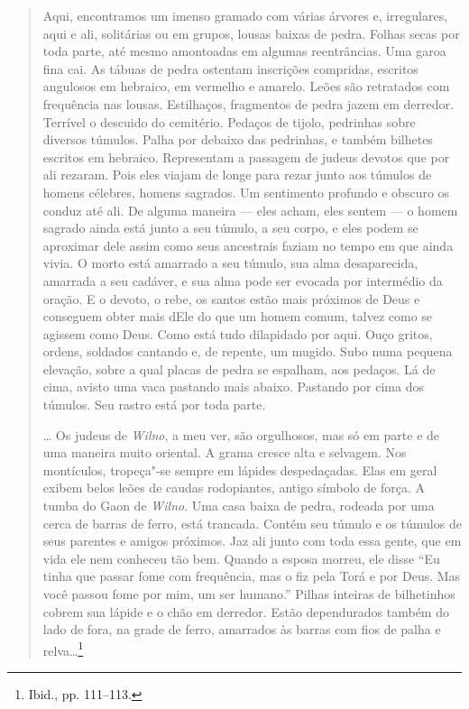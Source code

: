 %
\begin{quote}
Aqui, encontramos um imenso gramado com várias árvores e, irregulares,
aqui e ali, solitárias ou em grupos, lousas baixas de pedra. Folhas
secas por toda parte, até mesmo amontoadas em algumas reentrâncias. Uma
garoa fina cai. As tábuas de pedra ostentam inscrições compridas,
escritos angulosos em hebraico, em vermelho e amarelo. Leões são
retratados com frequência nas lousas. Estilhaços, fragmentos de pedra
jazem em derredor. Terrível o descuido do cemitério. Pedaços de tijolo,
pedrinhas sobre diversos túmulos. Palha por debaixo das pedrinhas, e
também bilhetes escritos em hebraico. Representam a passagem de judeus
devotos que por ali rezaram. Pois eles viajam de longe para rezar junto
aos túmulos de homens célebres, homens sagrados. Um sentimento profundo
e obscuro os conduz até ali. De alguma maneira --- eles acham, eles sentem
--- o homem sagrado ainda está junto a seu túmulo, a seu corpo, e eles
podem se aproximar dele assim como seus ancestrais faziam no tempo em
que ainda vivia. O morto está amarrado a seu túmulo, sua alma
desaparecida, amarrada a seu cadáver, e sua alma pode ser evocada por
intermédio da oração. E o devoto, o rebe, os santos estão mais próximos
de Deus e conseguem obter mais dEle do que um homem comum, talvez como
se agissem como Deus. Como está tudo dilapidado por aqui. Ouço gritos,
ordens, soldados cantando e, de repente, um mugido. Subo numa pequena
elevação, sobre a qual placas de pedra se espalham, aos pedaços. Lá de
cima, avisto uma vaca pastando mais abaixo. Pastando por cima dos
túmulos. Seu rastro está por toda parte.

\ldots{} Os judeus de \textit{Wilno}, a meu ver, são orgulhosos, mas só em parte
e de uma maneira muito oriental. A grama cresce alta e selvagem. Nos
montículos, tropeça"-se sempre em lápides despedaçadas. Elas em geral
exibem belos leões de caudas rodopiantes, antigo símbolo de força. A
tumba do Gaon de \textit{Wilno}. Uma casa baixa de pedra, rodeada por uma cerca
de barras de ferro, está trancada. Contém seu túmulo e os túmulos de
seus parentes e amigos próximos. Jaz ali junto com toda essa gente, que
em vida ele nem conheceu tão bem. Quando a esposa morreu, ele disse ``Eu
tinha que passar fome com frequência, mas o fiz pela Torá e por Deus.
Mas você passou fome por mim, um ser humano.'' Pilhas inteiras de
bilhetinhos cobrem sua lápide e o chão em derredor. Estão dependurados
também do lado de fora, na grade de ferro, amarrados às barras com fios
de palha e relva\ldots{}\footnote{Ibid., pp. 111--113.}
\end{quote}

